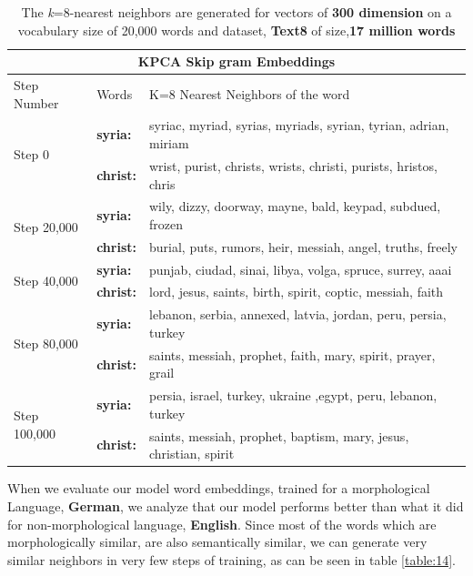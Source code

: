 \begin{table}
	\centering
	\begin{tabular}{|l|l|l|}
		\hline
		\multicolumn{3}{|c|}{KPCA Skip gram Embeddings} \\
		\hline
		Step Number & Words & K=8 Nearest Neighbors of the word \\ \hline
		\multirow{2}{*}{Step 0} &\textbf{syria:} &syriac, myriad, syrias, myriads, syrian, tyrian, adrian, miriam\\
		& \textbf{christ:} &wrist, purist, christs, wrists, christi, purists, hristos, chris\\ 
		\hline
		\multirow{2}{*}{Step 20,000} & \textbf{syria:} &wily, dizzy, doorway, mayne, bald, keypad, subdued, frozen\\
		& \textbf{christ:} &burial, puts, rumors, heir, messiah, angel, truths, freely\\
		\hline
		\multirow{2}{*}{Step 40,000} & \textbf{syria:} &punjab, ciudad, sinai, libya, volga, spruce, surrey, aaai\\
		& \textbf{christ:} &lord, jesus, saints, birth, spirit, coptic, messiah, faith\\
		\hline
		\multirow{2}{*}{Step 80,000} & \textbf{syria:} &lebanon, serbia, annexed, latvia, jordan, peru, persia, turkey\\
		& \textbf{christ:} &saints, messiah, prophet, faith, mary, spirit, prayer, grail\\
		\hline
		\multirow{2}{*}{Step 100,000} & \textbf{syria:} &persia, israel, turkey, ukraine ,egypt, peru, lebanon, turkey\\
		& \textbf{christ:} &saints, messiah, prophet, baptism, mary, jesus, christian, spirit\\
		\hline
	\end{tabular}
	\caption{The \textit{k}=8-nearest neighbors are generated for vectors of \textbf{300 dimension} on a vocabulary size of 20,000 words and dataset, \textbf{Text8} of size,\textbf{17 million words}}\label{table:13}
\end{table}
When we evaluate our model word embeddings, trained for a morphological Language, \textbf{German}, we analyze that our model performs better than what it did for non-morphological language, \textbf{English}. Since most of the words which are morphologically similar, are also semantically similar, we can generate very similar neighbors in very few steps of training, as can be seen in table \ref{table:14}.

